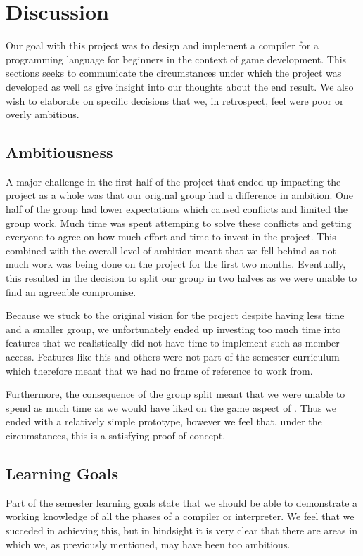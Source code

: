 \chapter{Discussion}
Our goal with this project was to design and implement a compiler for a programming language for beginners in the context of game development. 
This sections seeks to communicate the circumstances under which the project was developed as well as give insight into our thoughts about the end result.
We also wish to elaborate on specific decisions that we, in retrospect, feel were poor or overly ambitious.

\section{Ambitiousness}
A major challenge in the first half of the project that ended up impacting the project as a whole was that our original group had a difference in ambition. 
One half of the group had lower expectations which caused conflicts and limited the group work.
Much time was spent attemping to solve these conflicts and getting everyone to agree on how much effort and time to invest in the project.
This combined with the overall level of ambition meant that we fell behind as not much work was being done on the project for the first two months. 
Eventually, this resulted in the decision to split our group in two halves as we were unable to find an agreeable compromise.

Because we stuck to the original vision for the project despite having less time and a smaller group, we unfortunately ended up investing too much time into features that we realistically did not have time to implement such as member access.
Features like this and others were not part of the semester curriculum which therefore meant that we had no frame of reference to work from.

Furthermore, the consequence of the group split meant that we were unable to spend as much time as we would have liked on the game aspect of \dazel{}. 
Thus we ended with a relatively simple prototype, however we feel that, under the circumstances, this is a satisfying proof of concept.

\section{Learning Goals}
Part of the semester learning goals state that we should be able to demonstrate a working knowledge of all the phases of a compiler or interpreter. We feel that we succeded in achieving this, but in hindsight it is very clear that there are areas in which we, as previously mentioned, may have been too ambitious. 

